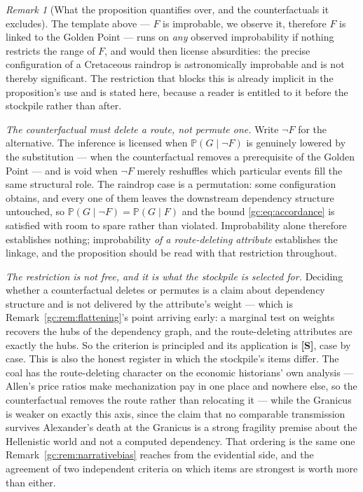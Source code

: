 \documentclass[11pt]{article}
\numberwithin{equation}{section}
\theoremstyle{plain}
\theoremstyle{definition}
\theoremstyle{remark}
\newtheorem{remark}[theorem]{Remark}
\newcommand{\PP}{\mathbb{P}}
\begin{document}
\begin{remark}[What the proposition quantifies over, and the
counterfactuals it excludes]\label{gc:rem:flukescope}
The template above --- $F$ is improbable, we observe it, therefore $F$
is linked to the Golden Point --- runs on \emph{any} observed
improbability if nothing restricts the range of $F$, and would then
license absurdities: the precise configuration of a Cretaceous
raindrop is astronomically improbable and is not thereby significant.
The restriction that blocks this is already implicit in the
proposition's use and is stated here, because a reader is entitled to
it before the stockpile rather than after.

\emph{The counterfactual must delete a route, not permute one.} Write
$\neg F$ for the alternative. The inference is licensed when
$\PP(G\mid\neg F)$ is genuinely lowered by the substitution --- when
the counterfactual removes a prerequisite of the Golden Point --- and
is void when $\neg F$ merely reshuffles which particular events fill
the same structural role. The raindrop case is a permutation: some
configuration obtains, and every one of them leaves the downstream
dependency structure untouched, so $\PP(G\mid\neg F)=\PP(G\mid F)$ and
the bound \eqref{gc:eq:accordance} is satisfied with room to spare
rather than violated. Improbability alone therefore establishes
nothing; improbability \emph{of a route-deleting attribute}
establishes the linkage, and the proposition should be read with that
restriction throughout.

\emph{The restriction is not free, and it is what the stockpile is
selected for.} Deciding whether a counterfactual deletes or permutes
is a claim about dependency structure and is not delivered by the
attribute's weight --- which is
Remark~\ref{gc:rem:flattening}'s point arriving early: a marginal test
on weights recovers the hubs of the dependency graph, and the
route-deleting attributes are exactly the hubs. So the criterion is
principled and its application is \textbf{[S]}, case by case. This is
also the honest register in which the stockpile's items differ. The
coal has the route-deleting character on the economic historians' own
analysis --- Allen's price ratios make mechanization pay in one place
and nowhere else, so the counterfactual removes the route rather than
relocating it \cite{Allen09} --- while the Granicus is weaker on
exactly this axis, since the claim that no comparable transmission
survives Alexander's death at the Granicus is a strong fragility
premise about the Hellenistic world and not a computed dependency.
That ordering is the same one Remark~\ref{gc:rem:narrativebias} reaches
from the evidential side, and the agreement of two independent
criteria on which items are strongest is worth more than either.
\end{remark}
\end{document}
